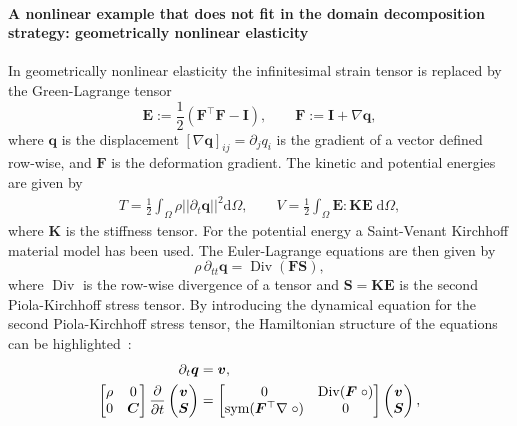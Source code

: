 \documentclass[11pt,a4paper]{article}
\renewcommand\d{\ensuremath{\mathrm{d}}}
\DeclareMathOperator*{\Div}{Div}
\DeclareMathOperator*{\sym}{sym}
\begin{document}
{\paragraph{A nonlinear example that does not fit in the domain decomposition strategy: geometrically nonlinear elasticity}
In geometrically nonlinear elasticity the infinitesimal strain tensor is replaced by the Green-Lagrange tensor 
$$
\bm{E} := \frac{1}{2}(\bm{F}^\top\bm{F} - \bm{I}), \qquad \bm{F} :=  \bm{I} + \nabla \bm{q},
$$
where $\bm{q}$ is the displacement $[\nabla \bm{q}]_{ij} = \partial_j q_i$ is the gradient of a vector defined row-wise, and $\bm{F}$ is the deformation gradient. The kinetic and potential energies are given by 
$$
\begin{aligned}
T = \frac{1}{2} \int_\Omega \rho ||{\partial_t \bm{q}}||^2 \d\Omega, \qquad
V = \frac{1}{2} \int_\Omega \bm{E}:\bm{K}\bm{E} \; \d\Omega,
\end{aligned}
$$
where $\bm{K}$ is the stiffness tensor. For the potential energy a Saint-Venant Kirchhoff material model has been used. The Euler-Lagrange equations are then given by
\begin{equation*}
\rho\, \partial_{tt}\bm{q} = \Div(\bm{F}\bm{S}),
\end{equation*}
where $\Div$ is the row-wise divergence of a tensor and $\bm{S}=\bm{K}\bm{E}$ is the second Piola-Kirchhoff stress tensor.  By introducing the dynamical equation for the second Piola-Kirchhoff stress tensor, the Hamiltonian structure of the equations can be highlighted~\cite{thoma2024velocity}:
\begin{equation*}
\begin{aligned}
\partial_t \bm{q} &= \bm{v}, \\
\begin{bmatrix}
    \rho & 0 \\
    0 & \bm{C}
\end{bmatrix}
\pdv{}{t}
\begin{pmatrix}
    \bm{v} \\
    \bm{S}
\end{pmatrix} &= 
\begin{bmatrix}
    0 & \Div (\bm{F} \; \circ) \\
    \sym( \bm{F}^\top \nabla \; \circ) & 0 \\
\end{bmatrix}
\begin{pmatrix}
    \bm{v} \\
    \bm{S}
\end{pmatrix},    
\end{aligned}

\end{equation*}}
\end{document}
